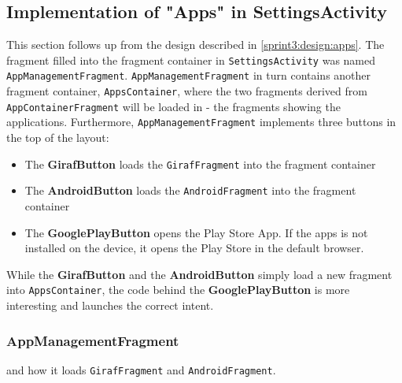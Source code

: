 \subsection{Implementation of "Apps" in SettingsActivity}
This section follows up from the design described in \cref{sprint3:design:apps}.
The fragment filled into the fragment container in \lstinline!SettingsActivity! was named \lstinline!AppManagementFragment!.
\lstinline!AppManagementFragment! in turn contains another fragment container, \lstinline!AppsContainer!, where the two fragments derived from \lstinline!AppContainerFragment! will be loaded in - the fragments showing the applications.
Furthermore, \lstinline!AppManagementFragment! implements three buttons in the top of the layout:

\begin{itemize}
\item The \textbf{GirafButton} loads the \lstinline!GirafFragment! into the fragment container
\item The \textbf{AndroidButton} loads the \lstinline!AndroidFragment! into the fragment container
\item The \textbf{GooglePlayButton} opens the Play Store App. If the apps is not installed on the device, it opens the Play Store in the default browser.
\end{itemize}

While the \textbf{GirafButton} and the \textbf{AndroidButton} simply load a new fragment into \lstinline!AppsContainer!, the code behind the \textbf{GooglePlayButton} is more interesting and launches the correct intent. 

\subsubsection{AppManagementFragment}



 and how it loads \lstinline!GirafFragment! and  \lstinline!AndroidFragment!.

